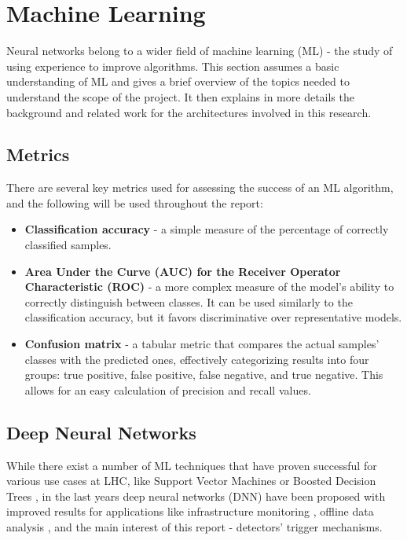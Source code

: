 \section{Machine Learning}
Neural networks belong to a wider field of machine learning (ML) - the study of using experience to improve algorithms. This section assumes a basic understanding of ML and gives a brief overview of the topics needed to understand the scope of the project. It then explains in more details the background and related work for the architectures involved in this research.


\subsection{Metrics} \label{ml-accuracy-auc-confusion}
There are several key metrics used for assessing the success of an ML algorithm, and the following will be used throughout the report:

\begin{itemize}
  \item \textbf{Classification accuracy} - a simple measure of the percentage of correctly classified samples.
  \item \textbf{Area Under the Curve (AUC) for the Receiver Operator Characteristic (ROC)} - a more complex measure of the model's ability to correctly distinguish between classes. It can be used similarly to the classification accuracy, but it favors discriminative over representative models.
  \item \textbf{Confusion matrix} - a tabular metric that compares the actual samples' classes with the predicted ones, effectively categorizing results into four groups: true positive, false positive, false negative, and true negative. This allows for an easy calculation of precision and recall values.
\end{itemize}

\indo{|}


\subsection{Deep Neural Networks}
While there exist a number of ML techniques that have proven successful for various use cases at LHC, like Support Vector Machines \cite{38-valentino2012classification} or Boosted Decision Trees \cite{pmlr-v42-chen14}, in the last years deep neural networks (DNN) have been proposed with improved results for applications like infrastructure monitoring \cite{39-skoczen2016lstm}, offline data analysis \cite{40-ren2020unveiling}, and the main interest of this report - detectors' trigger mechanisms.

